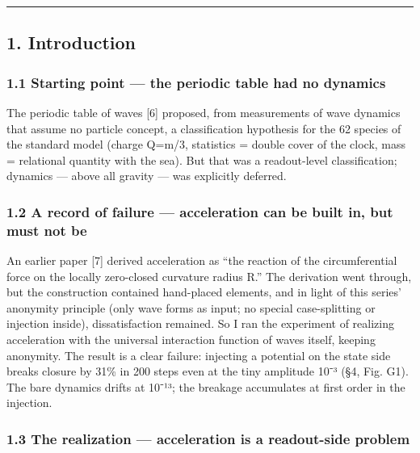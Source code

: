 \documentclass[
]{article}
\begin{document}
\begin{center}\rule{0.5\linewidth}{0.5pt}\end{center}

\subsection{1. Introduction}\label{introduction}

\subsubsection{1.1 Starting point --- the periodic table had no
dynamics}\label{starting-point-the-periodic-table-had-no-dynamics}

The periodic table of waves {[}6{]} proposed, from measurements of wave
dynamics that assume no particle concept, a classification hypothesis
for the 62 species of the standard model (charge Q=m/3, statistics =
double cover of the clock, mass = relational quantity with the sea). But
that was a readout-level classification; dynamics --- above all gravity
--- was explicitly deferred.

\subsubsection{1.2 A record of failure --- acceleration can be built in,
but must not
be}\label{a-record-of-failure-acceleration-can-be-built-in-but-must-not-be}

An earlier paper {[}7{]} derived acceleration as ``the reaction of the
circumferential force on the locally zero-closed curvature radius R.''
The derivation went through, but the construction contained hand-placed
elements, and in light of this series' anonymity principle (only wave
forms as input; no special case-splitting or injection inside),
dissatisfaction remained. So I ran the experiment of realizing
acceleration with the universal interaction function of waves itself,
keeping anonymity. The result is a clear failure: injecting a potential
on the state side breaks closure by 31\% in 200 steps even at the tiny
amplitude 10⁻³ (§4, Fig. G1). The bare dynamics drifts at 10⁻¹³; the
breakage accumulates at first order in the injection.

\subsubsection{1.3 The realization --- acceleration is a readout-side
problem}\label{the-realization-acceleration-is-a-readout-side-problem}
\end{document}
